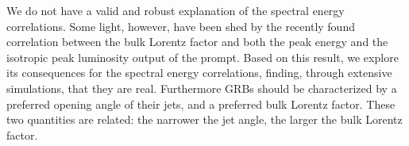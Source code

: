 


\bigskip



\bigskip

\noindent We do not have a valid and robust explanation of the spectral energy correlations. Some light, however, have been shed by the recently found correlation between the bulk Lorentz factor and both the peak energy and the isotropic peak luminosity output of the prompt. Based on this result, we explore its consequences for the spectral energy correlations, finding, through extensive simulations, that they are real. Furthermore GRBs should be characterized by a preferred opening angle of their jets, and a preferred bulk Lorentz factor. These two quantities are related: the narrower the jet angle, the larger the bulk Lorentz factor.

